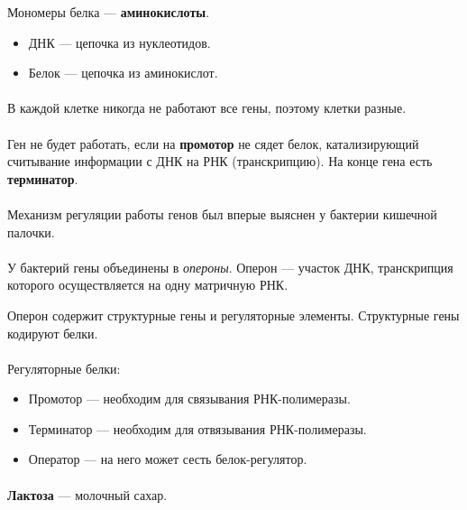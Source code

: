 \documentclass[dvipdfmx]{article}
\begin{document}
Мономеры белка --- \textbf{аминокислоты}.

\begin{itemize}
\item
  ДНК --- цепочка из нуклеотидов.
\item
  Белок --- цепочка из аминокислот.
\end{itemize}

\paragraph{}
В каждой клетке никогда не работают все гены, поэтому клетки разные.

\paragraph{}
Ген не будет работать, если на \textbf{промотор} не сядет белок, катализирующий считывание информации с
ДНК на РНК (транскрипцию). На конце гена есть \textbf{терминатор}.

\paragraph{}
Механизм регуляции работы генов был вперые выяснен у бактерии кишечной палочки.

\paragraph{}

У бактерий гены объединены в \textit{опероны}.
Оперон --- участок ДНК, транскрипция которого осуществляется на одну матричную РНК.

Оперон содержит структурные гены и регуляторные элементы.
Структурные гены кодируют белки.

\paragraph{}
Регуляторные белки:
\begin{itemize}
\item
  Промотор --- необходим для связывания РНК-полимеразы.
\item
  Терминатор --- необходим для отвязывания РНК-полимеразы.
\item
  Оператор --- на него может сесть белок-регулятор.
\end{itemize}
\paragraph{}
\textbf{Лактоза} --- молочный сахар.
\end{document}
